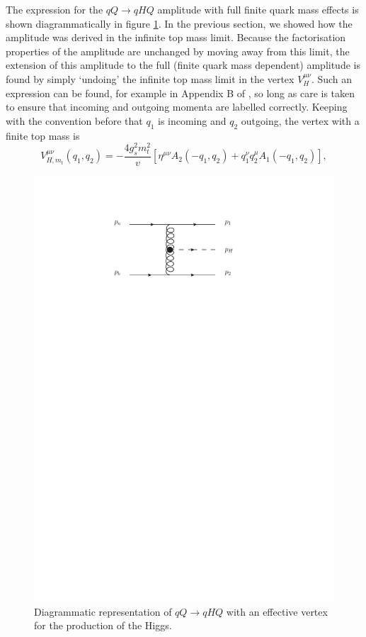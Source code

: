 The expression for the $qQ \to qHQ$ amplitude with full finite quark mass effects is shown diagrammatically in figure \ref{fig:qQh_eff}. In the previous section, we showed how the amplitude was derived in the infinite top mass limit. Because the factorisation properties of the amplitude are unchanged by moving away from this limit, the extension of this amplitude to the full (finite quark mass dependent) amplitude is found by simply `undoing' the infinite top mass limit in the vertex $V_H^{\mu \nu}$. Such an expression can be found, for example in Appendix B of \cite{Duca2003}, so long as care is taken to ensure that incoming and outgoing momenta are labelled correctly. Keeping with the convention before that $q_1$ is incoming and $q_2$ outgoing, the vertex with a finite top mass is
\begin{equation}
V^{\mu \nu}_{H, m_t}(q_1, q_2) = -\frac{4 g_s^2 m_t^2}{v} \left[\eta^{\mu \nu}A_2(-q_1,q_2) + q_1^\nu q_2^\mu A_1(-q_1,q_2) \right],
\end{equation}
\begin{figure}[t]
\centering
\includegraphics{Images/qQh_eff.pdf}
\caption{Diagrammatic representation of $qQ \to qHQ$ with an effective vertex for the production of the Higgs.}
\label{fig:qQh_eff}
\end{figure}

